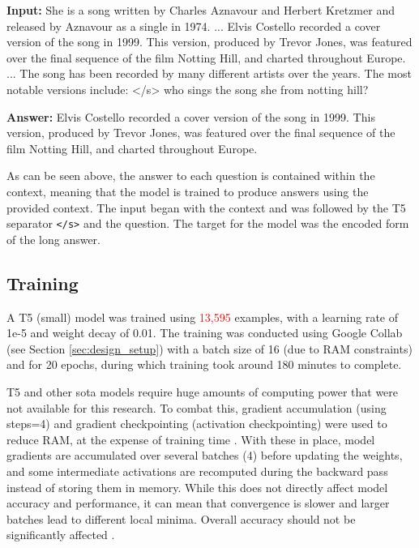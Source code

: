 \begin{itquote}
    \textbf{Input:} She is a song written by Charles Aznavour and Herbert Kretzmer and released by Aznavour as a single in 1974. ... Elvis Costello recorded a cover version of the song in 1999. This version, produced by Trevor Jones, was featured over the final sequence of the film Notting Hill, and charted throughout Europe. ... The song has been recorded by many different artists over the years. The most notable versions include: </s> who sings the song she from notting hill?
    
    \textbf{Answer:} Elvis Costello recorded a cover version of the song in 1999. This version, produced by Trevor Jones, was featured over the final sequence of the film Notting Hill, and charted throughout Europe.
\end{itquote}

As can be seen above, the answer to each question is contained within the context, meaning that the model is trained to produce answers using the provided context. The input began with the context and was followed by the T5 separator \texttt{</s>} and the question. The target for the model was the encoded form of the long answer. 

\subsection{Training}\label{sec:methodology_qa_training}
A T5 (small) model was trained using \textcolor{red}{13,595} examples, with a learning rate of 1e-5 and weight decay of 0.01. The training was conducted using Google Collab (see Section \ref{sec:design_setup}) with a batch size of 16 (due to RAM constraints) and for 20 epochs, during which training took around 180 minutes to complete. %

T5 and other \acrlong{sota} models require huge amounts of computing power that were not available for this research. To combat this, gradient accumulation (using steps=4) and gradient checkpointing  (activation checkpointing) were used to reduce RAM, at the expense of training time \citep{chen2016training}. With these in place, model gradients are accumulated over several batches (4) before updating the weights, and some intermediate activations are recomputed during the backward pass instead of storing them in memory. While this does not directly affect model accuracy and performance, it can mean that convergence is slower and larger batches lead to different local minima. Overall accuracy should not be significantly affected \citep{gradientAccumulation}. 

